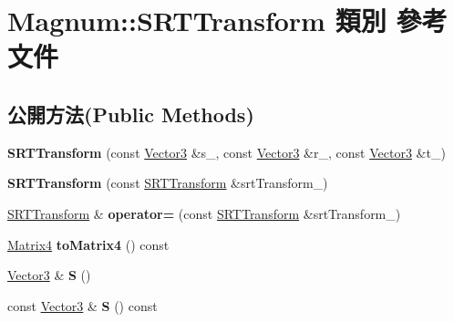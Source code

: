 \hypertarget{class_magnum_1_1_s_r_t_transform}{}\section{Magnum\+:\+:S\+R\+T\+Transform 類別 參考文件}
\label{class_magnum_1_1_s_r_t_transform}
\subsection*{公開方法(Public Methods)}
\begin{DoxyCompactItemize}
\item 
{\bfseries S\+R\+T\+Transform} (const \hyperlink{class_magnum_1_1_vector3}{Vector3} \&s\+\_\+, const \hyperlink{class_magnum_1_1_vector3}{Vector3} \&r\+\_\+, const \hyperlink{class_magnum_1_1_vector3}{Vector3} \&t\+\_\+)\hypertarget{class_magnum_1_1_s_r_t_transform_a0631aa9c8a6180e024a27b3af733c87f}{}\label{class_magnum_1_1_s_r_t_transform_a0631aa9c8a6180e024a27b3af733c87f}

\item 
{\bfseries S\+R\+T\+Transform} (const \hyperlink{class_magnum_1_1_s_r_t_transform}{S\+R\+T\+Transform} \&srt\+Transform\+\_\+)\hypertarget{class_magnum_1_1_s_r_t_transform_ac0501298032d2bbc3834dd73c5ea3f8b}{}\label{class_magnum_1_1_s_r_t_transform_ac0501298032d2bbc3834dd73c5ea3f8b}

\item 
\hyperlink{class_magnum_1_1_s_r_t_transform}{S\+R\+T\+Transform} \& {\bfseries operator=} (const \hyperlink{class_magnum_1_1_s_r_t_transform}{S\+R\+T\+Transform} \&srt\+Transform\+\_\+)\hypertarget{class_magnum_1_1_s_r_t_transform_a754c423ebf4328dad08aa2f8fa7e168a}{}\label{class_magnum_1_1_s_r_t_transform_a754c423ebf4328dad08aa2f8fa7e168a}

\item 
\hyperlink{class_magnum_1_1_matrix4}{Matrix4} {\bfseries to\+Matrix4} () const \hypertarget{class_magnum_1_1_s_r_t_transform_ab8f99b567d32fb61715d6478eebcf09a}{}\label{class_magnum_1_1_s_r_t_transform_ab8f99b567d32fb61715d6478eebcf09a}

\item 
\hyperlink{class_magnum_1_1_vector3}{Vector3} \& {\bfseries S} ()\hypertarget{class_magnum_1_1_s_r_t_transform_a135a6529f5e5eca999c71a2819d48171}{}\label{class_magnum_1_1_s_r_t_transform_a135a6529f5e5eca999c71a2819d48171}

\item 
const \hyperlink{class_magnum_1_1_vector3}{Vector3} \& {\bfseries S} () const \hypertarget{class_magnum_1_1_s_r_t_transform_ab9c2caaf2047ff77d82e87f0e181f1dc}{}\label{class_magnum_1_1_s_r_t_transform_ab9c2caaf2047ff77d82e87f0e181f1dc}


\end{DoxyCompactItemize}

